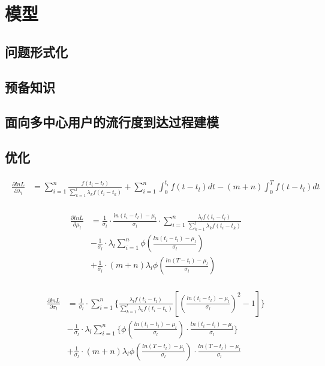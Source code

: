 \section{模型}
\subsection{问题形式化}
\subsection{预备知识}
\subsection{面向多中心用户的流行度到达过程建模}
\subsection{优化}

\begin{eqnarray}
\label{eq:gradLambda}
\begin{split}
\frac{\partial lnL}{\partial \lambda_l} & = \sum_{i=1}^{n}\frac{f(t_i-t_l)}{\sum_{k=1}^{l} \lambda_k f(t_i-t_k)} + \sum_{i=1}^{n} \int_{0}^{t_i}f(t-t_l)dt - (m+n)\int_{0}^{T}f(t-t_l)dt
\end{split}
\end{eqnarray}

\begin{eqnarray}
\label{eq:gradMu}
\begin{split}
\frac{\partial lnL}{\partial \mu_l} & = \frac{1}{\sigma_l} \cdot \frac{ln(t_i-t_l)-\mu_l}{\sigma_l} \cdot \sum_{i=1}^{n}\frac{\lambda_l f(t_i-t_l)}{\sum_{k=1}^{l} \lambda_k f(t_i-t_k)} \\
& - \frac{1}{\sigma_l} \cdot\lambda_l \sum_{i=1}^{n} \phi(\frac{ln(t_i-t_l)-\mu_l}{\sigma_l}) \\
& + \frac{1}{\sigma_l}\cdot (m+n)\lambda_l \phi(\frac{ln(T-t_l)-\mu_l}{\sigma_l})
\end{split}
\end{eqnarray}

\begin{eqnarray}
\label{eq:gradSigma}
\begin{split}
\frac{\partial lnL}{\partial \sigma_l} & = \frac{1}{\sigma_l} \cdot \sum_{i=1}^{n}\{\frac{\lambda_l f(t_i-t_l)}{\sum_{k=1}^{l} \lambda_k f(t_i-t_k)}[(\frac{ln(t_i-t_l)-\mu_l}{\sigma_l})^2-1]\} \\
& -\frac{1}{\sigma_l} \cdot \lambda_l\sum_{i=1}^{n}\{\phi(\frac{ln(t_i-t_l)-\mu_l}{\sigma_l}) \cdot \frac{ln(t_i-t_l)-\mu_l}{\sigma_l}\} \\
& + \frac{1}{\sigma_l} \cdot (m+n)\lambda_l \phi(\frac{ln(T-t_l)-\mu_l}{\sigma_l}) \cdot \frac{ln(T-t_l)-\mu_l}{\sigma_l}
\end{split}
\end{eqnarray}

